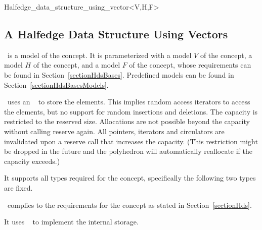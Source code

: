 \begin{ccClassTemplate}{Halfedge_data_structure_using_vector<V,H,F>}

\subsection{A Halfedge Data Structure Using Vectors}
\label{sectionHdsUsingVector}

\ccDefinition

\ccClassTemplateName\ is a model of the 
concept. It is parameterized with a model $V$ of the 
concept, a model $H$ of the  concept, and a model
$F$ of the  concept, whose requirements can be found
in Section~\ref{sectionHdsBases}.  Predefined models can be found in
Section~\ref{sectionHdsBasesModels}.

\ccClassTemplateName\ uses an \stl\  to store the
elements. This implies random access iterators to access the elements,
but no support for random insertions and deletions. The capacity is
restricted to the reserved size. Allocations are not possible beyond
the capacity without calling reserve again. All pointers, iterators
and circulators are invalidated upon a reserve call that increases the
capacity. (This restriction might be dropped in the future and the
polyhedron will automatically reallocate if the capacity exceeds.)


\ccTypes

It supports all types required for the  concept,
specifically the following two types are fixed.

\ccGlue
{}

\ccOperations

\ccClassTemplateName\ complies to the requirements for the concept
 as stated in
Section~\ref{sectionHds}.

\ccImplementation

It uses \stl\  to implement the internal storage.

\end{ccClassTemplate}


